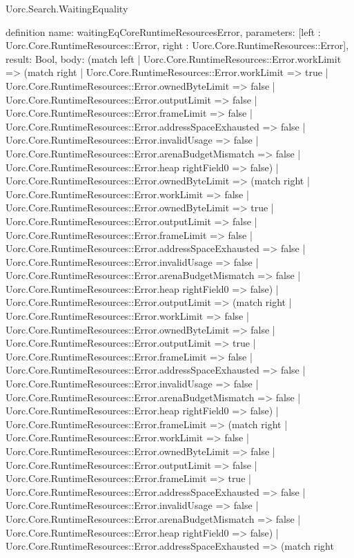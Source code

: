 \begin{lexlean}{Uorc.Search.WaitingEquality}
\begin{semanticmodule}
definition{
  name: waitingEqCoreRuntimeResourcesError,
  parameters: [left : Uorc.Core.RuntimeResources::Error, right : Uorc.Core.RuntimeResources::Error],
  result: Bool,
  body: (match left
    | Uorc.Core.RuntimeResources::Error.workLimit => (match right
      | Uorc.Core.RuntimeResources::Error.workLimit => true
      | Uorc.Core.RuntimeResources::Error.ownedByteLimit => false
      | Uorc.Core.RuntimeResources::Error.outputLimit => false
      | Uorc.Core.RuntimeResources::Error.frameLimit => false
      | Uorc.Core.RuntimeResources::Error.addressSpaceExhausted => false
      | Uorc.Core.RuntimeResources::Error.invalidUsage => false
      | Uorc.Core.RuntimeResources::Error.arenaBudgetMismatch => false
      | Uorc.Core.RuntimeResources::Error.heap rightField0 => false)
    | Uorc.Core.RuntimeResources::Error.ownedByteLimit => (match right
      | Uorc.Core.RuntimeResources::Error.workLimit => false
      | Uorc.Core.RuntimeResources::Error.ownedByteLimit => true
      | Uorc.Core.RuntimeResources::Error.outputLimit => false
      | Uorc.Core.RuntimeResources::Error.frameLimit => false
      | Uorc.Core.RuntimeResources::Error.addressSpaceExhausted => false
      | Uorc.Core.RuntimeResources::Error.invalidUsage => false
      | Uorc.Core.RuntimeResources::Error.arenaBudgetMismatch => false
      | Uorc.Core.RuntimeResources::Error.heap rightField0 => false)
    | Uorc.Core.RuntimeResources::Error.outputLimit => (match right
      | Uorc.Core.RuntimeResources::Error.workLimit => false
      | Uorc.Core.RuntimeResources::Error.ownedByteLimit => false
      | Uorc.Core.RuntimeResources::Error.outputLimit => true
      | Uorc.Core.RuntimeResources::Error.frameLimit => false
      | Uorc.Core.RuntimeResources::Error.addressSpaceExhausted => false
      | Uorc.Core.RuntimeResources::Error.invalidUsage => false
      | Uorc.Core.RuntimeResources::Error.arenaBudgetMismatch => false
      | Uorc.Core.RuntimeResources::Error.heap rightField0 => false)
    | Uorc.Core.RuntimeResources::Error.frameLimit => (match right
      | Uorc.Core.RuntimeResources::Error.workLimit => false
      | Uorc.Core.RuntimeResources::Error.ownedByteLimit => false
      | Uorc.Core.RuntimeResources::Error.outputLimit => false
      | Uorc.Core.RuntimeResources::Error.frameLimit => true
      | Uorc.Core.RuntimeResources::Error.addressSpaceExhausted => false
      | Uorc.Core.RuntimeResources::Error.invalidUsage => false
      | Uorc.Core.RuntimeResources::Error.arenaBudgetMismatch => false
      | Uorc.Core.RuntimeResources::Error.heap rightField0 => false)
    | Uorc.Core.RuntimeResources::Error.addressSpaceExhausted => (match right
}
\end{semanticmodule}
\end{lexlean}
